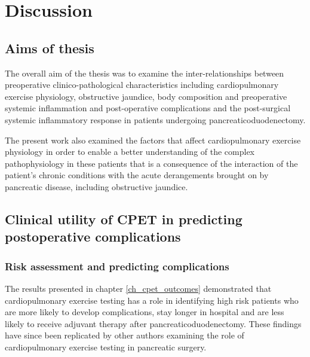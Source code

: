 
\chapter{Discussion}
\label{ch_discussion}


\clearpage
\section{Aims of thesis}

The overall aim of the thesis was to examine the inter-relationships between preoperative clinico-pathological characteristics including cardiopulmonary exercise physiology, obstructive jaundice, body composition and preoperative systemic inflammation and post-operative complications and the post-surgical systemic inflammatory response in patients undergoing pancreaticoduodenectomy.

The present work also examined the factors that affect cardiopulmonary exercise physiology in order to enable a better understanding of the complex pathophysiology in these patients that is a consequence of the interaction of the patient's chronic conditions with the acute derangements brought on by pancreatic disease, including obstructive jaundice.

\section{Clinical utility of CPET in predicting postoperative complications}

\subsection{Risk assessment and predicting complications}

The results presented in chapter \ref{ch_cpet_outcomes} demonstrated that cardiopulmonary exercise testing has a role in identifying high risk patients who are more likely to develop complications, stay longer in hospital and are less likely to receive adjuvant therapy after pancreaticoduodenectomy. 
These findings have since been replicated by other authors examining the role of cardiopulmonary exercise testing in pancreatic surgery. 

